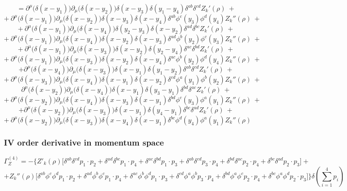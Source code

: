 $$= \partial^\mu\big(\delta(x - y_1)\big)\partial_\mu\big(\delta(x-y_2)\big)\delta(x - y_3)\delta(y_1 - y_4)\delta^{ab}\delta^{cd} Z_k'(\rho)\ +$$
$$+\ \partial^\mu\big(\delta(x - y_1)\big)\partial_\mu\big(\delta(x-y_2)\big)\delta(x - y_3)\delta(x - y_4)\delta^{ab}\phi^{c}(y_3)\phi^{d}(y_4) Z_k''(\rho)\ +$$
$$+\ \partial^\mu\big(\delta(x - y_1)\big)\partial_\mu\big(\delta(x-y_4)\big)\delta(y_2 - y_3)\delta(x - y_2)\delta^{ad}\delta^{bc} Z_k'(\rho)\ +$$
$$+\ \partial^\mu\big(\delta(x - y_1)\big)\partial_\mu\big(\delta(x-y_4)\big)\delta(x - y_2)\delta(x - y_3)\delta^{ad}\phi^{b}(y_2)\phi^{c}(y_3) Z_k''(\rho)\ +$$
$$+\ \partial^\mu\big(\delta(x - y_1)\big)\partial_\mu\big(\delta(x-y_3)\big)\delta(x - y_2)\delta(y_2 - y_4)\delta^{ac}\delta^{bd} Z_k'(\rho)\ +$$
$$+\ \partial^\mu\big(\delta(x - y_1)\big)\partial_\mu\big(\delta(x-y_3)\big)\delta(x - y_2)\delta(x - y_4)\delta^{ac}\phi^{b}(y_2)\phi^{d}(y_4) Z_k''(\rho)\ +$$
$$+ \partial^\mu\big(\delta(x - y_4)\big)\partial_\mu\big(\delta(x-y_3)\big)\delta(x - y_1)\delta(y_1 - y_2)\delta^{ab}\delta^{cd} Z_k'(\rho)\ +$$
$$+\ \partial^\mu\big(\delta(x - y_3)\big)\partial_\mu\big(\delta(x-y_4)\big)\delta(x - y_1)\delta(x - y_2)\delta^{cd}\phi^{a}(y_1)\phi^{b}(y_2) Z_k''(\rho)\ +$$
$$ \partial^\mu\big(\delta(x - y_2)\big)\partial_\mu\big(\delta(x-y_4)\big)\delta(x - y_1)\delta(y_3 - y_1)\delta^{bd}\delta^{ac} Z_k'(\rho)\ +$$
$$+\ \partial^\mu\big(\delta(x - y_2)\big)\partial_\mu\big(\delta(x-y_4)\big)\delta(x - y_3)\delta(x - y_1)\delta^{bd}\phi^{c}(y_3)\phi^{a}(y_1) Z_k''(\rho)\ +$$
$$+ \partial^\mu\big(\delta(x - y_2)\big)\partial_\mu\big(\delta(x-y_3)\big)\delta(x - y_1)\delta(y_4 - y_1)\delta^{bc}\delta^{ad} Z_k'(\rho)\ +$$
$$+\ \partial^\mu\big(\delta(x - y_2)\big)\partial_\mu\big(\delta(x-y_3)\big)\delta(x - y_4)\delta(x - y_1)\delta^{bc}\phi^{d}(y_4)\phi^{a}(y_1) Z_k''(\rho)$$

\subsubsection{IV order derivative in momentum space}
\begin{equation}\label{Z4}
 \Gamma^{(4)}_Z = - \Bigg\{Z'_k(\rho)\Big[\delta^{ab}\delta^{cd}p_1\cdot p_2 + \delta^{ad}\delta^{bc}p_1\cdot p_4 + \delta^{ac}\delta^{bd}p_1\cdot p_3 + \delta^{ab}\delta^{cd}p_3\cdot p_4 + \delta^{bd}\delta^{ac}p_2\cdot p_4 + \delta^{bc}\delta^{ad}p_2\cdot p_3\Big] +
\end{equation}
$$ + Z_k''(\rho) \Big[\delta^{ab}\phi^c\phi^dp_1\cdot p_2 + \delta^{ad}\phi^b\phi^c p_1\cdot p_4+ \delta^{ac}\phi^b\phi^dp_1\cdot p_3 + \delta^{cd}\phi^a\phi^b p_3\cdot p_4 + \delta^{bd}\phi^a\phi^cp_2\cdot p_4 + \delta^{bc}\phi^a\phi^dp_2\cdot p_3\Big]\Bigg\}\delta\left(\sum^4_{i = 1}p_i\right)$$
